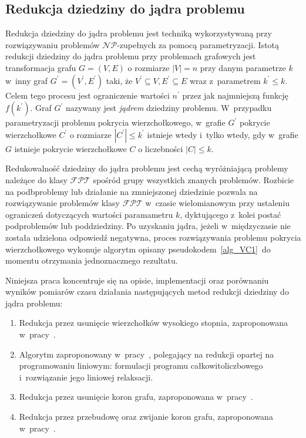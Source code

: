 \subsection{Redukcja dziedziny do jądra problemu}\label{subsection_kernelization}
\par{
  Redukcja dziedziny do jądra problemu jest techniką wykorzystywaną przy
  rozwiązywaniu problemów $\mathcal{NP}$-zupełnych za pomocą parametryzacji.
  Istotą redukcji dziedziny do jądra problemu przy problemach grafowych
  jest transformacja grafu $G=(V,E)$ o rozmiarze $|V|=n$ przy danym parametrze $k$ w~inny
  graf $G^{\prime}=(V^{\prime}, E^{\prime})$ taki, że $V^{\prime} \subseteq V, E^{\prime} \subseteq E$
  wraz z~parametrem $k^{\prime} \leq k$.
  Celem tego procesu jest ograniczenie wartości $n^{\prime}$ przez jak najmniejszą
  funkcję $f(k^{\prime})$.
  Graf $G^{\prime}$ nazywany jest \emph{jądrem} dziedziny problemu.
  W~przypadku parametryzacji problemu pokrycia wierzchołkowego, w~grafie
  $G^{\prime}$ pokrycie wierzchołkowe $C^{\prime}$ o rozmiarze $|C^{\prime}|\leq k^{\prime}$ istnieje wtedy i~tylko wtedy, gdy w~grafie $G$ istnieje pokrycie wierzchołkowe $C$ o liczebności $|C| \leq k$.
}
\par{
  Redukowalność dziedziny do jądra problemu jest cechą wyróżniającą problemy 
  należące do klasy $\mathcal{FPT}$ spośród grupy wszystkich znanych problemów.
  Rozbicie na podbproblemy lub działanie na zmniejszonej dziedzinie pozwala na
  rozwiązywanie problemów klasy $\mathcal{FPT}$ w~czasie wielomianowym przy
  ustaleniu ograniczeń dotyczących wartości paramametru $k$, dyktującego z~kolei
  postać podproblemów lub poddziedziny.
  Po uzyskaniu jądra, jeżeli w~międzyczasie nie została udzielona odpowiedź negatywna, proces rozwiązywania problemu pokrycia wierzchołkowego
  wykonuje algorytm opisany pseudokodem~\ref{alg_VC1}\ do momentu otrzymania jednoznacznego rezultatu.
}
\par{
  Niniejsza praca koncentruje się na opisie, implementacji oraz porównaniu wyników pomiarów czasu działania następujących metod redukcji dziedziny do
  jądra problemu:
  \begin{enumerate}
    \item Redukcja przez usunięcie wierzchołków wysokiego stopnia, zaproponowana
      w~pracy~\cite{KernelizationAlgorithms04}.
    \item Algorytm zaproponowany w~pracy~\cite{KernelizationAlgorithms04}, polegający
      na redukcji opartej na programowaniu liniowym: formulacji programu
      całkowitoliczbowego i~rozwiązanie jego liniowej relaksacji.
    \item Redukcja przez usunięcie koron grafu, zaproponowana
      w~pracy~\cite{abukhzam03}.
    \item Redukcja przez przebudowę oraz zwijanie koron grafu, zaproponowana
      w~pracy~\cite{ImprovedBounds10}.
  \end{enumerate}
}
